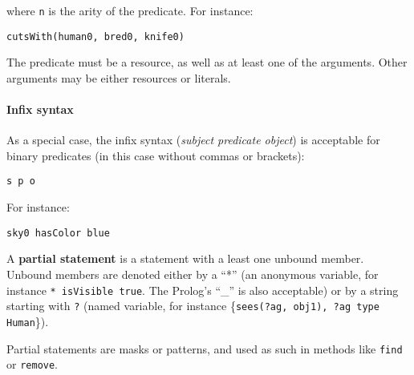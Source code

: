where \texttt{n} is the arity of the predicate. For instance:

    \begin{center}  \tt cutsWith(human0, bred0, knife0) \end{center}

The predicate must be a resource, as well as at least one of the arguments.
Other arguments may be either resources or literals.

\paragraph{Infix syntax}

As a special case, the infix syntax (\emph{subject predicate object}) is
acceptable for binary predicates (in this case without commas or brackets):

    \begin{center} \tt s p o \end{center}

For instance:

    \begin{center} \tt sky0 hasColor blue \end{center}


% 
% 
% 
% 
% 
% 

A \textbf{partial statement} is a statement with a least one unbound member.
Unbound members are denoted either by a ``*'' (an anonymous variable, for
instance \texttt{* isVisible true}. The Prolog's ``\_'' is also acceptable) or by
a string starting with \texttt{?} (named variable, for instance
\{\texttt{sees(?ag, obj1), ?ag type Human}\}).

Partial statements are masks or patterns, and used as such in
methods like \texttt{find} or \texttt{remove}.

